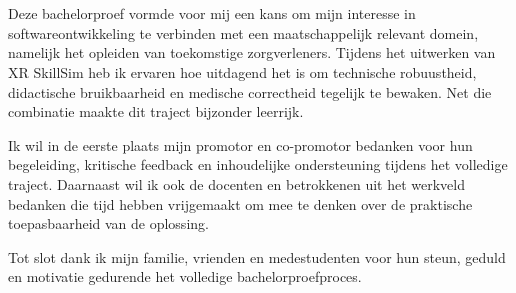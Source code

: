 
\chapter*{}%
\label{ch:voorwoord}

Deze bachelorproef vormde voor mij een kans om mijn interesse in softwareontwikkeling te verbinden met een maatschappelijk relevant domein, namelijk het opleiden van toekomstige zorgverleners. Tijdens het uitwerken van XR SkillSim heb ik ervaren hoe uitdagend het is om technische robuustheid, didactische bruikbaarheid en medische correctheid tegelijk te bewaken. Net die combinatie maakte dit traject bijzonder leerrijk.

Ik wil in de eerste plaats mijn promotor en co-promotor bedanken voor hun begeleiding, kritische feedback en inhoudelijke ondersteuning tijdens het volledige traject. Daarnaast wil ik ook de docenten en betrokkenen uit het werkveld bedanken die tijd hebben vrijgemaakt om mee te denken over de praktische toepasbaarheid van de oplossing.

Tot slot dank ik mijn familie, vrienden en medestudenten voor hun steun, geduld en motivatie gedurende het volledige bachelorproefproces.